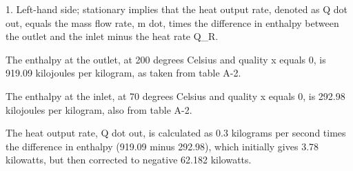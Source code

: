 1. Left-hand side; stationary implies that the heat output rate, denoted as Q dot out, equals the mass flow rate, m dot, times the difference in enthalpy between the outlet and the inlet minus the heat rate Q_R.

The enthalpy at the outlet, at 200 degrees Celsius and quality x equals 0, is 919.09 kilojoules per kilogram, as taken from table A-2.

The enthalpy at the inlet, at 70 degrees Celsius and quality x equals 0, is 292.98 kilojoules per kilogram, also from table A-2.

The heat output rate, Q dot out, is calculated as 0.3 kilograms per second times the difference in enthalpy (919.09 minus 292.98), which initially gives 3.78 kilowatts, but then corrected to negative 62.182 kilowatts.